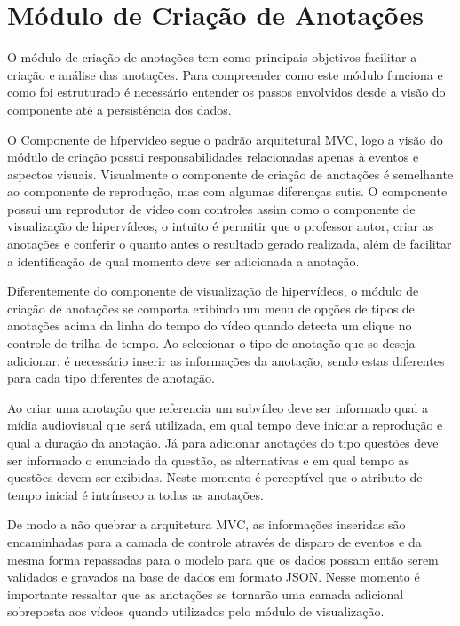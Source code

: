 \section{Módulo de Criação de Anotações}

O módulo de criação de anotações tem como principais objetivos facilitar a criação e análise das anotações. Para compreender como este módulo funciona e como foi estruturado é necessário entender os passos envolvidos desde a visão do componente até a persistência dos dados.

O Componente de hípervideo segue o padrão arquitetural MVC, logo a visão do módulo de criação possui responsabilidades relacionadas apenas à eventos e aspectos visuais. Visualmente o componente de criação de anotações é semelhante ao componente de reprodução, mas com algumas diferenças sutis. O componente possui um reprodutor de vídeo com controles assim como o componente de visualização de hipervídeos, o intuito é permitir que o professor autor, criar as anotações e conferir o quanto antes o resultado gerado realizada, além de facilitar a identificação de qual momento deve ser adicionada a anotação.

Diferentemente do componente de visualização de hipervídeos, o módulo de criação de anotações se comporta exibindo um menu de opções de tipos de anotações acima da linha do tempo do vídeo quando detecta um clique no controle de trilha de tempo. Ao selecionar o tipo de anotação que se deseja adicionar, é necessário inserir as informações da anotação, sendo estas diferentes para cada tipo diferentes de anotação.

Ao criar uma anotação que referencia um subvídeo deve ser informado qual a mídia audiovisual que será utilizada, em qual tempo deve iniciar a reprodução e qual a duração da anotação. Já para adicionar anotações do tipo questões deve ser informado o enunciado da questão, as alternativas e em qual tempo as questões devem ser exibidas. Neste momento é perceptível que o atributo de tempo inicial é intrínseco a todas as anotações.

De modo a não quebrar a arquitetura MVC, as informações inseridas são encaminhadas para a camada de controle através de disparo de eventos e da mesma forma repassadas para o modelo para que os dados possam então serem validados e gravados na base de dados em formato JSON. Nesse momento é importante ressaltar que as anotações se tornarão uma camada adicional sobreposta aos vídeos quando utilizados pelo módulo de visualização.

